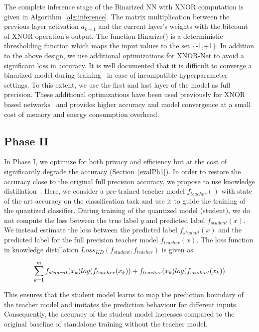 The complete inference stage of the Binarized NN with XNOR computation is given in Algorithm~\ref{alg:inference}.
The matrix multiplication between the previous layer activation $a_{k-1}$ and the current layer's weights with the bitcount of XNOR operation's output.
The function Binarize() is a deterministic thresholding function which maps the input values to the set \{-1,+1\}.
In addition to the above design, we use additional optimizations for XNOR-Net to avoid a significant loss in accuracy.
It is well documented that it is difficult to converge a binarized model during training~\cite{AAAI1714619} in case of incompatible hyperparameter settings. To this extent, we use the first and last layer of the model as full precision.
These additional optimizations have been used previously for XNOR based networks~\cite{8114708,rastegari2016xnornet} and provides higher accuracy and model convergence at a small cost of memory and energy consumption overhead.







\subsection{Phase II}
\label{p2}

In Phase I, we optimize for both privacy and efficiency but at the cost of significantly degrade the accuracy (Section~\ref{evalPh1}).
In order to restore the accuracy close to the original full precision accuracy, we propose to use knowledge distillation~\cite{44873}.
Here, we consider a pre-trained teacher model $f_{teacher}()$ with state of the art accuracy on the classification task and use it to guide the training of the quantized classifier.
During training of the quantized model (student), we do not compute the loss between the true label $y$ and predicted label $f_{student}(x)$.
We instead estimate the loss between the predicted label $f_{student}(x)$ and the predicted label for the full precision teacher model $f_{teacher}(x)$.
The loss function in knowledge distillation $Loss_{KD} (f_{student}, f_{teacher})$ is given as

\begin{equation}
\footnotesize
\sum_{k=1}^m f_{student}(x_k)log(f_{teacher}(x_k)) + f_{teacher}(x_k)log(f_{student}(x_k))
\end{equation}


This ensures that the student model learns to map the prediction boundary of the teacher model and imitates the prediction behaviour for different inputs.
Consequently, the accuracy of the student model increases compared to the original baseline of standalone training without the teacher model.
